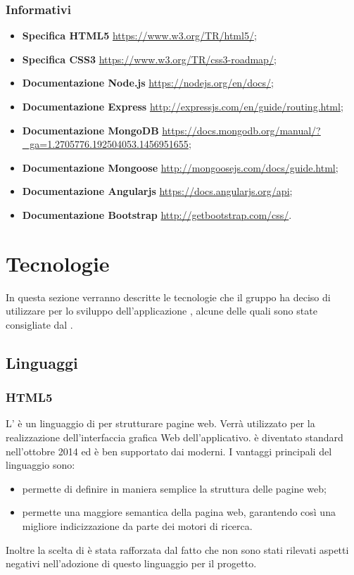 \documentclass[12pt,a4paper]{article}
\begin{document}
\subsubsection{Informativi}
\begin{itemize}
    \item \textbf{Specifica HTML5} \url{https://www.w3.org/TR/html5/};
    \item \textbf{Specifica CSS3} \url{https://www.w3.org/TR/css3-roadmap/};
    \item \textbf{Documentazione Node.js} \url{https://nodejs.org/en/docs/};
    \item \textbf{Documentazione Express} \url{http://expressjs.com/en/guide/routing.html};
    \item \textbf{Documentazione MongoDB} \url{https://docs.mongodb.org/manual/?_ga=1.2705776.192504053.1456951655};
    \item \textbf{Documentazione Mongoose} \url{http://mongoosejs.com/docs/guide.html};
    \item \textbf{Documentazione Angularjs} \url{https://docs.angularjs.org/api};
    \item \textbf{Documentazione Bootstrap} \url{http://getbootstrap.com/css/}.
\end{itemize}

\newpage

\section{Tecnologie}\label{tecnologie}
In questa sezione verranno descritte le tecnologie che il gruppo ha deciso di utilizzare per lo sviluppo dell'applicazione \prjL{}, alcune delle quali sono state consigliate dal .

\subsection{Linguaggi}
\subsubsection{HTML5}\label{html}
L’ è un linguaggio di  per strutturare pagine web. Verrà utilizzato per la realizzazione dell’interfaccia grafica Web dell’applicativo.  è diventato standard  nell’ottobre 2014 ed è ben supportato dai  moderni. I vantaggi principali del linguaggio sono:

\begin{itemize}
	\item permette di definire in maniera semplice la struttura delle pagine web;
	\item permette una maggiore semantica della pagina web, garantendo così una migliore indicizzazione da parte dei motori di ricerca.
\end{itemize}
Inoltre la scelta di  è stata rafforzata dal fatto che non sono stati rilevati aspetti negativi nell'adozione di questo linguaggio per il progetto. 
\end{document}
